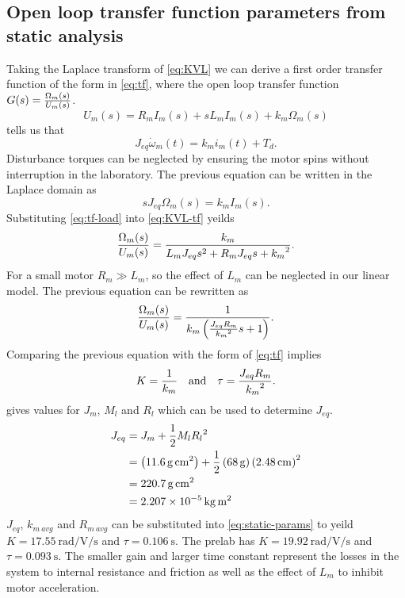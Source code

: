 \subsection{Open loop transfer function parameters from static analysis}\label{sec:tf-static}
Taking the Laplace transform of \eqref{eq:KVL} we can derive a first order transfer function of the form in \eqref{eq:tf}, where the open loop transfer function $G(s) = {\Omega_m(s) \over U_m(s)}$.
\begin{equation}\label{eq:KVL-tf}
  U_m(s) = R_m I_m(s) + s L_m I_m(s) + k_m \Omega_m(s)
\end{equation}
\cite{lab-manual} tells us that
\begin{equation*}
  J_{eq} \dot{\omega}_m(t) = k_m i_m(t) + T_d.
\end{equation*}
Disturbance torques can be neglected by ensuring the motor spins without interruption in the laboratory.
The previous equation can be written in the Laplace domain as
\begin{equation}\label{eq:tf-load}
  sJ_{eq} \Omega_m(s) = k_m I_m(s).
\end{equation}
Substituting \eqref{eq:tf-load} into \eqref{eq:KVL-tf} yeilds
\begin{equation*}
  {\Omega_m(s) \over U_m(s)} = {k_m \over L_m J_{eq}s^2 + R_m J_{eq} s + {k_m}^2}.
\end{equation*}
For a small motor $R_m \gg L_m$, so the effect of $L_m$ can be neglected in our linear model.
The previous equation can be rewritten as
\begin{equation*}
  {\Omega_m(s) \over U_m(s)} = { 1 \over k_m \left( {J_{eq} R_m \over {k_m}^2} s + 1 \right)}.
\end{equation*}
Comparing the previous equation with the form of \eqref{eq:tf} implies
\begin{equation}\label{eq:static-params}
  K = {1 \over k_m} \quad \text{and} \quad \tau = {J_{eq} R_m \over {k_m}^2}.
\end{equation}
\cite{lab-manual} gives values for $J_m$, $M_l$ and $R_l$ which can be used to determine $J_{eq}$.
\begin{align*}
  J_{eq} &= J_m + {1 \over 2} M_l {R_l}^2 \\
         &= \left(\SI{11.6}{\gram\square\centi\meter}\right) + {1 \over 2} \left(\SI{68}{\gram}\right) \left(\SI{2.48}{\centi\meter}\right)^2 \\
         &= \SI{220.7}{\gram\square\centi\meter} \\
         &= \SI{2.207e-5}{\kilogram\square\meter}
\end{align*}
$J_{eq}$, $k_{m\>avg}$ and $R_{m\>avg}$ can be substituted into \eqref{eq:static-params} to yeild $K = \SI{17.55}{\radian\per\volt\per\second}$ and $\tau = \SI{0.106}{\second}$.
The prelab has $K = \SI{19.92}{\radian\per\volt\per\second}$ and $\tau = \SI{0.093}{\second}$.
The smaller gain and larger time constant represent the losses in the system to internal resistance and friction as well as the effect of $L_m$ to inhibit motor acceleration.


